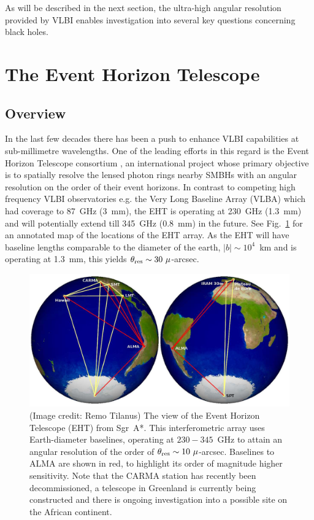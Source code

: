 As will be described in the next section, the ultra-high angular resolution provided by VLBI enables investigation into several key questions concerning black holes.



\section{The Event Horizon Telescope}
\subsection{Overview}

In the last few decades there has been a push to enhance VLBI capabilities at sub-millimetre wavelengths. One of the leading efforts in this regard is the Event Horizon Telescope consortium \citep[(EHT),][]{Doeleman_2010}, an international project whose primary objective is to spatially resolve the lensed photon rings nearby SMBHs with an angular resolution on the order of their event horizons. In contrast to competing high frequency VLBI observatories e.g. the Very Long Baseline Array (VLBA) which had coverage to 87~GHz (3~mm), the EHT is operating at 230~GHz (1.3~mm) and will potentially extend till 345~GHz (0.8~mm) in the future. See Fig.~\ref{fig:eht_globe} for an annotated map of the locations of the EHT array. As the EHT will have baseline lengths comparable to the diameter of the earth, $|b| \sim 10^4$~km and is operating at 1.3~mm, this yields $\theta_{\rm res} \sim 30\ \mu$-arcsec.

\begin{figure}
\includegraphics[width=0.8\columnwidth]{Images/eht_globe}
\caption{(Image credit: Remo Tilanus) The view of the Event Horizon Telescope (EHT) from Sgr~A*. This interferometric array uses Earth-diameter baselines, operating at $230-345$~GHz to attain an angular resolution of the order of ${\theta_{\rm res} \sim 10\ \mu}$-arcsec. Baselines to ALMA are shown in red, to highlight its order of magnitude higher sensitivity. Note that the CARMA station has recently been decommissioned, a telescope in Greenland is currently being constructed and there is ongoing investigation into a possible site on the African continent.\label{fig:eht_globe}%
}
\end{figure}



